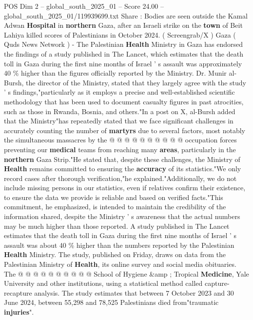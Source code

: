 \begin{textsample}{POS Dim 2 – global\_south\_2025\_01 – Score 24.00 – global\_south\_2025\_01/119939699.txt}  \label{ex:f2_pos_318}
Share : Bodies are seen outside the Kamal Adwan \textbf{Hospital} in \textbf{northern} Gaza, after an Israeli strike on the \textbf{town} of Beit Lahiya killed scores of Palestinians in October 2024. ( Screengrab/X ) Gaza ( Quds News Network ) - The Palestinian \textbf{Health} Ministry in Gaza has endorsed the findings of a study published in The Lancet, which estimates that the death toll in Gaza during the first nine months of Israel ' s assault was approximately 40 \% higher than the figures officially reported by the Ministry.
Dr.
Munir al-Bursh, the director of the Ministry, stated that they largely agree with the study ' s findings,"particularly as it employs a precise and well-established scientific methodology that has been used to document casualty figures in past atrocities, such as those in Rwanda, Bosnia, and others."In a post on X, al-Bursh added that the Ministry"has repeatedly stated that we face significant challenges in accurately counting the number of \textbf{martyrs} due to several factors, most notably the simultaneous massacres by the @ @ @ @ @ @ @ @ @ @ occupation forces preventing our \textbf{medical} teams from reaching many \textbf{areas}, particularly in the \textbf{northern} Gaza Strip."He stated that, despite these challenges, the Ministry of \textbf{Health} remains committed to ensuring the \textbf{accuracy} of its statistics."We only record cases after thorough verification,"he explained."Additionally, we do not include missing persons in our statistics, even if relatives confirm their existence, to ensure the data we provide is reliable and based on verified facts."This commitment, he emphasized, is intended to maintain the credibility of the information shared, despite the Ministry ' s awareness that the actual numbers may be much higher than those reported.
A study published in The Lancet estimates that the death toll in Gaza during the first nine months of Israel ' s assault was about 40 \% higher than the numbers reported by the Palestinian \textbf{Health} Ministry.
The study, published on Friday, draws on data from the Palestinian Ministry of \textbf{Health}, its online survey and social media obituaries.
The @ @ @ @ @ @ @ @ @ @ School of Hygiene \&amp ; Tropical \textbf{Medicine}, Yale University and other institutions, using a statistical method called capture-recapture analysis.
The study estimates that between 7 October 2023 and 30 June 2024, between 55,298 and 78,525 Palestinians died from"traumatic \textbf{injuries}".

\end{textsample}
